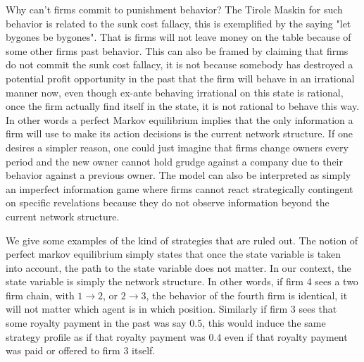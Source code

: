 \documentclass{article}
\begin{document}
Why can't firms commit to punishment behavior? The Tirole Maskin for such behavior is related to the sunk cost fallacy, this is exemplified by the saying "let bygones be bygones". That is firms will not leave money on the table because of some other firms past behavior. This can also be framed by claiming that firms do not commit the sunk cost fallacy, it is not because somebody has destroyed a potential profit opportunity in the past that the firm will behave in an irrational manner now, even though ex-ante behaving irrational on this state is rational, once the firm actually find itself in the state, it is not rational to behave this way. In other words a perfect Markov equilibrium implies that the only information a firm will use to make its action decisions is the current network structure. If one desires a simpler reason, one could just imagine that firms change owners every period and the new owner cannot hold grudge against a company due to their behavior against a previous owner. The model can also be interpreted as simply an imperfect information game where firms cannot react strategically contingent on specific revelations because they do not observe information beyond the current network structure. 

We give some examples of the kind of strategies that are ruled out. The notion of perfect markov equilibrium simply states that once the state variable is taken into account, the path to the state variable does not matter. In our context, the state variable is simply the network structure. In other words, if firm 4 sees a two firm chain, with $1 \rightarrow 2$, or $2 \rightarrow 3$, the behavior of the fourth firm is identical, it will not matter which agent is in which position. Similarly if firm 3 sees that some royalty payment in the past was say 0.5, this would induce the same strategy profile as if that royalty payment was 0.4 even if that royalty payment was paid or offered to firm 3 itself. 
\end{document}
